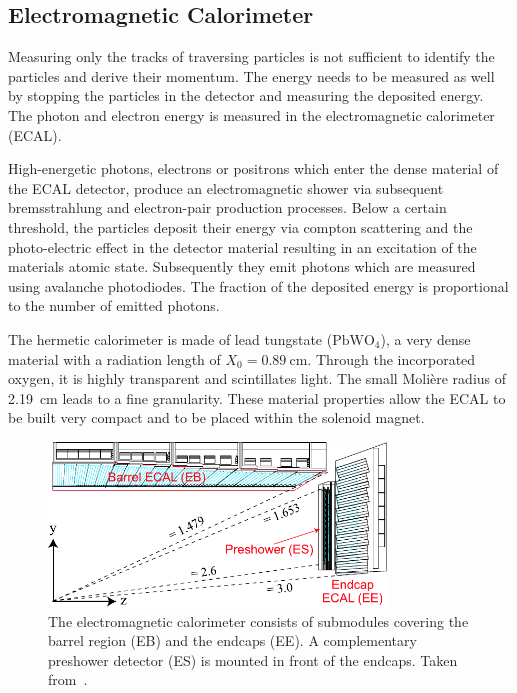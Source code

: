 \subsection{Electromagnetic Calorimeter}

Measuring only the tracks of traversing particles is not sufficient to identify
the particles and derive their momentum. The energy needs to be measured as well
by stopping the particles in the detector and measuring the
deposited energy. The photon and electron energy is measured in the
electromagnetic calorimeter (ECAL). 

High-energetic photons, electrons or positrons which enter the dense material of
the ECAL detector, produce an electromagnetic shower via subsequent
bremsstrahlung and electron-pair production processes. Below a certain
threshold, the particles deposit their energy via compton scattering and the
photo-electric effect in the detector material resulting in an excitation of the
materials atomic state. Subsequently they emit photons which are measured using
avalanche photodiodes. The fraction of the deposited energy is proportional to
the number of emitted photons.

The hermetic calorimeter is made of lead tungstate ($\mathrm{PbWO}_4$), a very
dense material with a radiation length of $X_0 = \SI{0.89}{\centi\meter}$.
Through the incorporated oxygen, it is highly transparent and scintillates
light.  The small Moli\`ere  radius of \SI{2.19}{\centi\meter} leads to a fine
granularity.  These material properties allow the ECAL to be built very compact
and to be placed within the solenoid magnet. 

\begin{figure}[htp]
    \centering
    \includegraphics[width=0.8\textwidth]{figures/cms_detector/cms_ecal.pdf}\hfill
    \caption[Electromagnetic Calorimeter]{The electromagnetic calorimeter
    consists of submodules covering the barrel region (EB) and the endcaps (EE).
    A complementary preshower detector (ES) is mounted in front of the
    endcaps. Taken from~\cite{Bayatian:922757}.}
    \label{fig:cms:ecal}
\end{figure}

